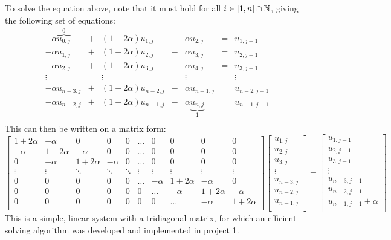 \documentclass[12pt,english,a4paper]{article}
\begin{document}
To solve the equation above, note that it must hold for all \(i\in\qty[1,n]\cap\mathbb{N}\), giving the following set of equations:
\[
    \begin{array}{ccccccc}
        -\alpha \overbrace{u_{0,j}}^0 &+& (1+2\alpha)u_{1,j} &-& \alpha u_{2,j} &=& u_{1,j-1}\\
        -\alpha u_{1,j} &+& (1+2\alpha)u_{2,j} &-& \alpha u_{3,j} &=& u_{2,j-1}\\
        -\alpha u_{2,j} &+& (1+2\alpha)u_{3,j} &-& \alpha u_{4,j} &=& u_{3,j-1}\\
        \vdots && \vdots && \vdots && \vdots\\
        -\alpha u_{n-3,j} &+& (1+2\alpha)u_{n-2,j} &-& \alpha u_{n-1,j} &=& u_{n-2,j-1}\\
        -\alpha u_{n-2,j} &+& (1+2\alpha)u_{n-1,j} &-& \alpha \underbrace{u_{n,j}}_1 &=& u_{n-1,j-1}\\
    \end{array}
\]
This can then be written on a matrix form:
\[
    \begin{bmatrix}
        1 + 2\alpha & -\alpha & 0 & 0 & 0 & \dots & 0 & 0 & 0 & 0  \\
        -\alpha & 1+2\alpha & -\alpha & 0 & 0 & \dots & 0 & 0 & 0 & 0  \\
        0 & -\alpha & 1+2\alpha & -\alpha & 0 & \dots & 0 & 0 & 0 & 0 \\
        \vdots & \vdots &  \ddots & \ddots & \ddots & \vdots & \vdots & \vdots & \vdots & \vdots\\
        0 & 0 & 0 & 0 & 0 & \dots & -\alpha & 1+2\alpha & - \alpha & 0\\
        0 & 0 & 0 & 0 & 0 & 0 & \dots & -\alpha & 1+2\alpha & - \alpha\\
        0 & 0 & 0 & 0 & 0 & 0 & 0 & \dots & -\alpha & 1+2\alpha\\
    \end{bmatrix}
    \begin{bmatrix}
        u_{1,j}\\
        u_{2,j}\\
        u_{3,j}\\
        \vdots\\
        u_{n-3,j}\\
        u_{n-2,j}\\
        u_{n-1,j}\\
    \end{bmatrix}
    =
    \begin{bmatrix}
        u_{1,j-1}\\
        u_{2,j-1}\\
        u_{3,j-1}\\
        \vdots\\
        u_{n-3,j-1}\\
        u_{n-2,j-1}\\
        u_{n-1,j-1} + \alpha\\
    \end{bmatrix}
\]
This is a simple, linear system with a tridiagonal matrix, for which an efficient solving algorithm was developed and implemented in project 1\cite{oblig1}.
\end{document}
